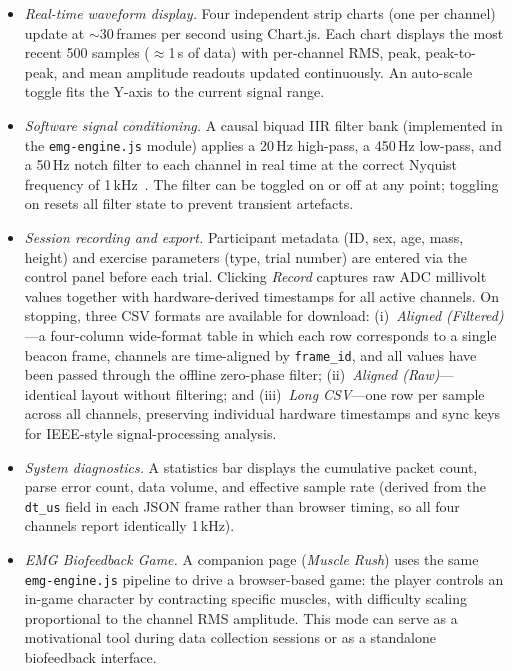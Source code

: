 \begin{itemize}
  \item \textit{Real-time waveform display.} Four independent strip charts (one per channel) update at $\sim$30\,frames per second using Chart.js. Each chart displays the most recent 500 samples ($\approx$1\,s of data) with per-channel RMS, peak, peak-to-peak, and mean amplitude readouts updated continuously. An auto-scale toggle fits the Y-axis to the current signal range.

  \item \textit{Software signal conditioning.} A causal biquad IIR filter bank (implemented in the \texttt{emg-engine.js} module) applies a 20\,Hz high-pass, a 450\,Hz low-pass, and a 50\,Hz notch filter to each channel in real time at the correct Nyquist frequency of 1\,kHz~\cite{robertson2004research}. The filter can be toggled on or off at any point; toggling on resets all filter state to prevent transient artefacts.

  \item \textit{Session recording and export.} Participant metadata (ID, sex, age, mass, height) and exercise parameters (type, trial number) are entered via the control panel before each trial. Clicking \emph{Record} captures raw ADC millivolt values together with hardware-derived timestamps for all active channels. On stopping, three CSV formats are available for download: (i)~\emph{Aligned (Filtered)}---a four-column wide-format table in which each row corresponds to a single beacon frame, channels are time-aligned by \texttt{frame\_id}, and all values have been passed through the offline zero-phase filter; (ii)~\emph{Aligned (Raw)}---identical layout without filtering; and (iii)~\emph{Long CSV}---one row per sample across all channels, preserving individual hardware timestamps and sync keys for IEEE-style signal-processing analysis.

  \item \textit{System diagnostics.} A statistics bar displays the cumulative packet count, parse error count, data volume, and effective sample rate (derived from the \texttt{dt\_us} field in each JSON frame rather than browser timing, so all four channels report identically 1\,kHz).

  \item \textit{EMG Biofeedback Game.} A companion page (\emph{Muscle Rush}) uses the same \texttt{emg-engine.js} pipeline to drive a browser-based game: the player controls an in-game character by contracting specific muscles, with difficulty scaling proportional to the channel RMS amplitude. This mode can serve as a motivational tool during data collection sessions or as a standalone biofeedback interface.
\end{itemize}

